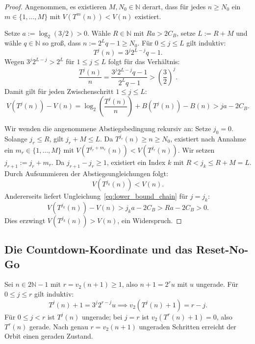 \documentclass[11pt,reqno]{amsart}
\theoremstyle{definition}
\theoremstyle{remark}
\numberwithin{equation}{section}
\begin{document}
\begin{proof}
Angenommen, es existieren $M, N_0 \in \mathbb{N}$ derart, dass f\"ur jedes $n \ge N_0$ ein $m \in \{1, \dots, M\}$ mit $V(T^m(n)) < V(n)$ existiert.

Setze $a := \log_2(3/2) > 0$. W\"ahle $R \in \mathbb{N}$ mit $Ra > 2C_B$, setze $L := R + M$ und wähle $q \in \mathbb{N}$ so gro\ss{}, dass $n := 2^L q - 1 \ge N_0$.
F\"ur $0 \le j \le L$ gilt induktiv:
\begin{equation}
T^j(n) = 3^j 2^{L-j} q - 1.
\end{equation}
Wegen $3^j 2^{L-j} > 2^L$ f\"ur $1 \le j \le L$ folgt f\"ur das Verh\"altnis:
\begin{equation}
\frac{T^j(n)}{n} = \frac{3^j 2^{L-j} q - 1}{2^L q - 1} > \left(\frac{3}{2}\right)^j.
\end{equation}
Damit gilt f\"ur jeden Zwischenschritt $1 \le j \le L$:
\begin{equation}
V(T^j(n)) - V(n) = \log_2\left(\frac{T^j(n)}{n}\right) + B(T^j(n)) - B(n) > j a - 2C_B.
\label{eq:lower_bound_chain}
\end{equation}

Wir wenden die angenommene Abstiegsbedingung rekursiv an:
Setze $j_0 = 0$. Solange $j_r \le R$, gilt $j_r + M \le L$. Da $T^{j_r}(n) \ge n \ge N_0$, existiert nach Annahme ein $m_r \in \{1, \dots, M\}$ mit $V(T^{j_r + m_r}(n)) < V(T^{j_r}(n))$.
Wir setzen $j_{r+1} := j_r + m_r$. Da $j_{r+1} - j_r \ge 1$, existiert ein Index $k$ mit $R < j_k \le R + M = L$. 
Durch Aufsummieren der Abstiegsungleichungen folgt:
\begin{equation}
V(T^{j_k}(n)) < V(n).
\end{equation}
Andererseits liefert Ungleichung~\eqref{eq:lower_bound_chain} f\"ur $j = j_k$:
\begin{equation}
V(T^{j_k}(n)) - V(n) > j_k a - 2C_B > R a - 2C_B > 0.
\end{equation}
Dies erzwingt $V(T^{j_k}(n)) > V(n)$, ein Widerspruch.
\end{proof}

\subsection{Die Countdown-Koordinate und das Reset-No-Go}

Sei $n \in 2\mathbb{N}-1$ mit $r = v_2(n+1) \ge 1$, also $n + 1 = 2^r u$ mit $u$ ungerade. F\"ur $0 \le j \le r$ gilt induktiv:
\begin{equation}
T^j(n) + 1 = 3^j 2^{r-j} u \implies v_2(T^j(n) + 1) = r - j.
\end{equation}
F\"ur $0 \le j < r$ ist $T^j(n)$ ungerade; bei $j = r$ ist $v_2(T^r(n)+1) = 0$, also $T^r(n)$ gerade.
Nach genau $r = v_2(n+1)$ ungeraden Schritten erreicht der Orbit einen geraden Zustand.
\end{document}
